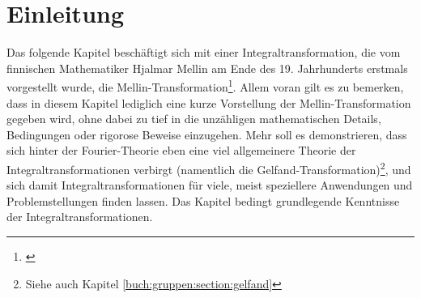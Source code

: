 %
%
%

\section{Einleitung\label{mellin:section:teil0}}

Das folgende Kapitel beschäftigt sich mit einer Integraltransformation, die vom finnischen Mathematiker Hjalmar 
Mellin am Ende des 19. Jahrhunderts erstmals vorgestellt wurde, die Mellin-Transformation\footnote{\cite{mellin:mellin-wikipedia}}.
Allem voran gilt es zu bemerken, dass in diesem Kapitel lediglich eine kurze Vorstellung der Mellin-Transformation 
gegeben wird, ohne dabei zu tief in die unzähligen mathematischen Details, Bedingungen oder rigorose Beweise einzugehen.
Mehr soll es demonstrieren, dass sich hinter der Fourier-Theorie eben eine viel allgemeinere Theorie der Integraltransformationen 
verbirgt (namentlich die Gelfand-Transformation)\footnote{Siehe auch Kapitel \ref{buch:gruppen:section:gelfand}}, und sich damit 
Integraltransformationen für viele, meist speziellere Anwendungen und Problemstellungen finden lassen.
Das Kapitel bedingt grundlegende Kenntnisse der Integraltransformationen.








